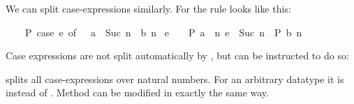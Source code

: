 \begin{isabellebody}
\begin{isamarkuptext}
We can split case-expressions similarly. For  the rule looks like this:
\begin{isabelle}%
\ \ \ \ P\ {}case\ e\ of\ {}\ {}\ a\ {}\ Suc\ n\ {}\ b\ n{}\ {}\isanewline
{}e\ {}\ {}\ {}\ P\ a{}\ {}\ {}{}n{}\ e\ {}\ Suc\ n\ {}\ P\ {}b\ n{}{}{}%
\end{isabelle}
Case expressions are not split automatically by , but 
can be instructed to do so:
\begin{quote}
\end{quote}
splits all case-expressions over natural numbers. For an arbitrary
datatype  it is  instead of .
Method  can be modified in exactly the same way.%
\end{isamarkuptext}%
\isamarkuptrue%
%
\isadelimtheory
%
\endisadelimtheory
%
\isatagtheory
%
\endisatagtheory
{\isafoldtheory}%
%
\isadelimtheory
%
\endisadelimtheory
\end{isabellebody}%
